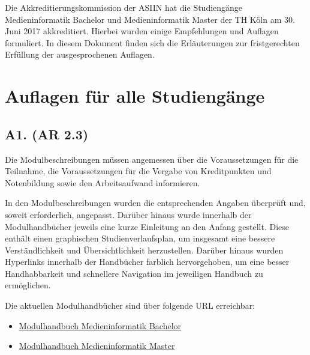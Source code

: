 Die Akkreditierungskommission der ASIIN hat die Studiengänge
Medieninformatik Bachelor und Medieninformatik Master der TH Köln am 30.
Juni 2017 akkreditiert. Hierbei wurden einige Empfehlungen und Auflagen
formuliert. In diesem Dokument finden sich die Erläuterungen zur
fristgerechten Erfüllung der ausgesprochenen Auflagen.

\section{Auflagen für alle
Studiengänge\label{/mi-2017/selbstbericht/auflagen/0000-auflagen}}\label{auflagen-fuxfcr-alle-studienguxe4ngepathlabelmi-2017selbstberichtauflagen0000-auflagen}

\subsection{A1. (AR
2.3)\label{/mi-2017/selbstbericht/auflagen/0000-auflagen}}\label{a1.-ar-2.3pathlabelmi-2017selbstberichtauflagen0000-auflagen}

\begin{siderules}
Die Modulbeschreibungen müssen angemessen über die Voraussetzungen für
die Teilnahme, die Voraussetzungen für die Vergabe von Kreditpunkten und
Notenbildung sowie den Arbeitsaufwand informieren.
\end{siderules}

In den Modulbeschreibungen wurden die entsprechenden Angaben überprüft
und, soweit erforderlich, angepasst. Darüber hinaus wurde innerhalb der
Modulhandbücher jeweils eine kurze Einleitung an den Anfang gestellt.
Diese enthält einen graphischen Studienverlaufsplan, um insgesamt eine
bessere Verständlichkeit und Übersichtlichkeit herzustellen. Darüber
hinaus wurden Hyperlinks innerhalb der Handbücher farblich
hervorgehoben, um eine besser Handhabbarkeit und schnellere Navigation
im jeweiligen Handbuch zu ermöglichen.

Die aktuellen Modulhandbücher sind über folgende URL erreichbar:

\begin{itemize}
\tightlist
\item
  \href{http://www.medieninformatik.th-koeln.de/download/modulbeschreibungen-bachelor-bpo4.pdf}{Modulhandbuch
  Medieninformatik Bachelor}
\item
  \href{http://www.medieninformatik.th-koeln.de/download/modulbeschreibungen-master-mpo4.pdf}{Modulhandbuch
  Medieninformatik Master}
\end{itemize}

